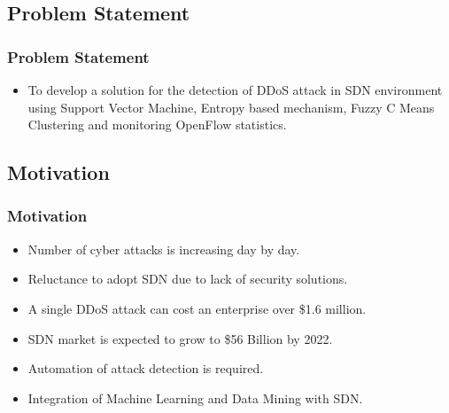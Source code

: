 \documentclass[10pt]{beamer}
\begin{document}
\begin{frame}
\section[]{Problem Statement}
\frametitle{Problem Statement}
\begin{itemize}
\footnotesize
\item
To develop a solution for the detection of DDoS attack in SDN environment using Support Vector Machine, Entropy based mechanism, Fuzzy C Means Clustering and monitoring OpenFlow statistics.
\end{itemize}
\end{frame}




\begin{frame}
\section[]{Motivation}
\frametitle{Motivation}
\begin{center}
\begin{itemize}
\footnotesize
\item 
Number of cyber attacks is increasing day by day.
\item
Reluctance to adopt SDN due to lack of security solutions.
\item
A single DDoS attack can cost an enterprise over \$1.6 million.
\item
SDN market is expected to grow to \$56 Billion by 2022.
\item
Automation of attack detection is required.
\item
Integration of Machine Learning and Data Mining with SDN. 
\end{itemize}
\end{center}

\end{frame}
\end{document}
